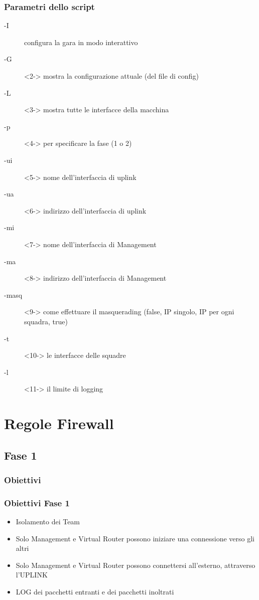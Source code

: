 \documentclass{beamer}
\begin{document}
\begin{frame}
    \frametitle{Parametri dello script}
    \begin{description}
        \item[-I] configura la gara in modo interattivo
        \item[-G]<2-> mostra la configurazione attuale (del file di config)
        \item[-L]<3-> mostra tutte le interfacce della macchina
        \item[-p]<4-> per specificare la fase (1 o 2)
        \item[-ui]<5-> nome dell'interfaccia di uplink
        \item[-ua]<6-> indirizzo dell'interfaccia di uplink
        \item[-mi]<7-> nome dell'interfaccia di Management
        \item[-ma]<8-> indirizzo dell'interfaccia di Management
        \item[-masq]<9-> come effettuare il masquerading (false, IP singolo, IP per ogni squadra, true)
        \item[-t]<10-> le interfacce delle squadre
        \item[-l]<11-> il limite di logging
    \end{description}
\end{frame}

\section{Regole Firewall}
\subsection{Fase 1}
\subsubsection{Obiettivi}
\begin{frame}
    \frametitle{Obiettivi Fase 1}
    \begin{itemize}
        \item<1-> Isolamento dei Team
        \item<2-> Solo Management e Virtual Router possono iniziare una connessione verso gli altri
        \item<3-> Solo Management e Virtual Router possono connettersi all'esterno, attraverso l'UPLINK
        \item<4-> LOG dei pacchetti entranti e dei pacchetti inoltrati
    \end{itemize}

\end{frame}
\end{document}
